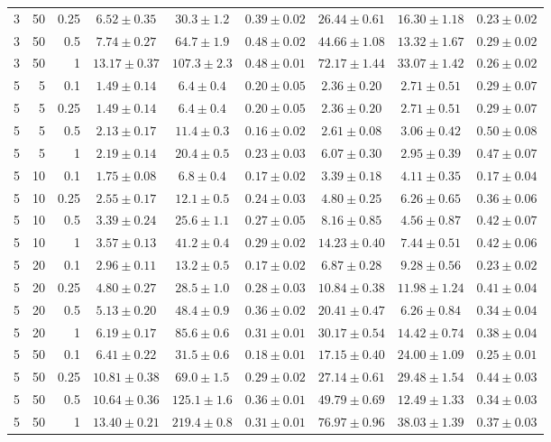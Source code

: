 \begin{table}[htbp]
\begin{tabular}{@{}rrrcccccc@{}}
3 & 50 & 0.25 & $6.52 \pm 0.35$ & $30.3 \pm 1.2$ & $0.39 \pm 0.02$ & $26.44 \pm 0.61$ & $16.30 \pm 1.18$ & $0.23 \pm 0.02$ \\
3 & 50 & 0.5 & $7.74 \pm 0.27$ & $64.7 \pm 1.9$ & $0.48 \pm 0.02$ & $44.66 \pm 1.08$ & $13.32 \pm 1.67$ & $0.29 \pm 0.02$ \\
3 & 50 & 1 & $13.17 \pm 0.37$ & $107.3 \pm 2.3$ & $0.48 \pm 0.01$ & $72.17 \pm 1.44$ & $33.07 \pm 1.42$ & $0.26 \pm 0.02$ \\
\midrule
5 & 5 & 0.1 & $1.49 \pm 0.14$ & $6.4 \pm 0.4$ & $0.20 \pm 0.05$ & $2.36 \pm 0.20$ & $2.71 \pm 0.51$ & $0.29 \pm 0.07$ \\
5 & 5 & 0.25 & $1.49 \pm 0.14$ & $6.4 \pm 0.4$ & $0.20 \pm 0.05$ & $2.36 \pm 0.20$ & $2.71 \pm 0.51$ & $0.29 \pm 0.07$ \\
5 & 5 & 0.5 & $2.13 \pm 0.17$ & $11.4 \pm 0.3$ & $0.16 \pm 0.02$ & $2.61 \pm 0.08$ & $3.06 \pm 0.42$ & $0.50 \pm 0.08$ \\
5 & 5 & 1 & $2.19 \pm 0.14$ & $20.4 \pm 0.5$ & $0.23 \pm 0.03$ & $6.07 \pm 0.30$ & $2.95 \pm 0.39$ & $0.47 \pm 0.07$ \\
5 & 10 & 0.1 & $1.75 \pm 0.08$ & $6.8 \pm 0.4$ & $0.17 \pm 0.02$ & $3.39 \pm 0.18$ & $4.11 \pm 0.35$ & $0.17 \pm 0.04$ \\
5 & 10 & 0.25 & $2.55 \pm 0.17$ & $12.1 \pm 0.5$ & $0.24 \pm 0.03$ & $4.80 \pm 0.25$ & $6.26 \pm 0.65$ & $0.36 \pm 0.06$ \\
5 & 10 & 0.5 & $3.39 \pm 0.24$ & $25.6 \pm 1.1$ & $0.27 \pm 0.05$ & $8.16 \pm 0.85$ & $4.56 \pm 0.87$ & $0.42 \pm 0.07$ \\
5 & 10 & 1 & $3.57 \pm 0.13$ & $41.2 \pm 0.4$ & $0.29 \pm 0.02$ & $14.23 \pm 0.40$ & $7.44 \pm 0.51$ & $0.42 \pm 0.06$ \\
5 & 20 & 0.1 & $2.96 \pm 0.11$ & $13.2 \pm 0.5$ & $0.17 \pm 0.02$ & $6.87 \pm 0.28$ & $9.28 \pm 0.56$ & $0.23 \pm 0.02$ \\
5 & 20 & 0.25 & $4.80 \pm 0.27$ & $28.5 \pm 1.0$ & $0.28 \pm 0.03$ & $10.84 \pm 0.38$ & $11.98 \pm 1.24$ & $0.41 \pm 0.04$ \\
5 & 20 & 0.5 & $5.13 \pm 0.20$ & $48.4 \pm 0.9$ & $0.36 \pm 0.02$ & $20.41 \pm 0.47$ & $6.26 \pm 0.84$ & $0.34 \pm 0.04$ \\
5 & 20 & 1 & $6.19 \pm 0.17$ & $85.6 \pm 0.6$ & $0.31 \pm 0.01$ & $30.17 \pm 0.54$ & $14.42 \pm 0.74$ & $0.38 \pm 0.04$ \\
5 & 50 & 0.1 & $6.41 \pm 0.22$ & $31.5 \pm 0.6$ & $0.18 \pm 0.01$ & $17.15 \pm 0.40$ & $24.00 \pm 1.09$ & $0.25 \pm 0.01$ \\
5 & 50 & 0.25 & $10.81 \pm 0.38$ & $69.0 \pm 1.5$ & $0.29 \pm 0.02$ & $27.14 \pm 0.61$ & $29.48 \pm 1.54$ & $0.44 \pm 0.03$ \\
5 & 50 & 0.5 & $10.64 \pm 0.36$ & $125.1 \pm 1.6$ & $0.36 \pm 0.01$ & $49.79 \pm 0.69$ & $12.49 \pm 1.33$ & $0.34 \pm 0.03$ \\
5 & 50 & 1 & $13.40 \pm 0.21$ & $219.4 \pm 0.8$ & $0.31 \pm 0.01$ & $76.97 \pm 0.96$ & $38.03 \pm 1.39$ & $0.37 \pm 0.03$ \\
\bottomrule
\end{tabular}
\end{table}
